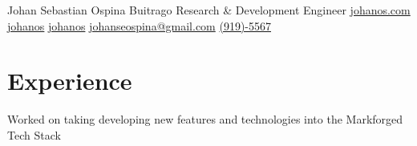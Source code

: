 \documentclass[]{plushcv}
\begin{document}
%
%

\namesection
{Johan Sebastian}
{Ospina Buitrago}
{Research \& Development Engineer}
{
    \contactline
    {\href{https://www.johanos.com}{johanos.com}}
    {\href{https://www.github.com/johanos}{johanos}}
    {\href{https://www.linkedin.com/in/johanos}
        {johanos}}
    {\href{mailto:johanseospina@gmail.com}{johanseospina@gmail.com}}
    {\href{tel:+1 (919) 946-5567}{(919)-5567}}
}

%
%

\begin{minipage}[t]{0.70\textwidth}



    \section{Experience}
    \vspace{\topsep} %
    \begin{tightemize}
        \sectionsep
        \item Worked on taking developing new features and technologies into the Markforged Tech Stack
    \end{tightemize}
    \sectionsep


\end{minipage}
\end{document}
